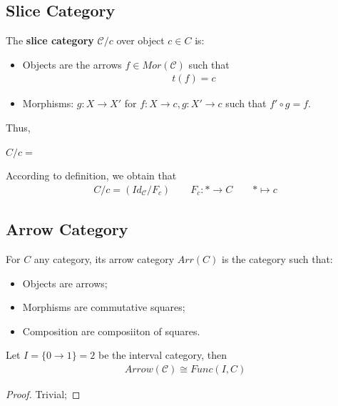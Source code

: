\documentclass[Total.tex]{subfiles}
\begin{document}
				\subsection{Slice Category}
					\begin{Def}
						The \textbf{slice category} $\mathcal{C}/c$ over object $c\in C$ is:
						\begin{itemize}
							\item Objects are the arrows $f\in Mor(\mathcal{C})$ such that
							\begin{gather*}
								t(f)=c
							\end{gather*}
							\item Morphisms: $g:X\rightarrow X'$ for $f:X\rightarrow c,g:X'\rightarrow c$ such that $f'\circ g=f$.
						\end{itemize}
						
						Thus,
						\begin{center}
							$C/c=$
						\end{center}
					\end{Def}
					
					According to definition, we obtain that
					\begin{gather*}
						C/c=(Id_\mathcal{C}/F_c)\qquad F_c:*\rightarrow C\qquad *\mapsto c
					\end{gather*}
			\subsection{Arrow Category}
				\begin{Def}
					For $C$ any category, its arrow category $Arr(C)$ is the category such that:
					\begin{itemize}
						\item Objects are arrows;
						\item Morphisms are commutative squares;
						\item Composition are composiiton of squares.
					\end{itemize}
				\end{Def}
				
				\begin{proposition}
					Let $I=\{0\rightarrow 1\}=2$ be the interval  category, then
					\begin{gather*}
						Arrow(\mathcal{C})\cong Func(I,C)
					\end{gather*}
				\end{proposition}
				\begin{proof}
					Trivial;
				\end{proof}
			
\end{document}
